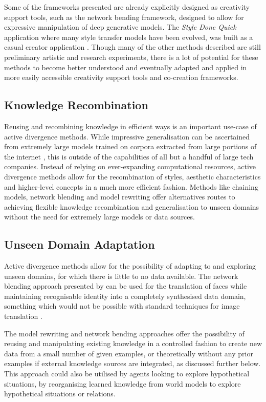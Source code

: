 Some of the frameworks presented are already explicitly designed as creativity support tools, such as the network bending framework, designed to allow for expressive manipulation of deep generative models. 
The \textit{Style Done Quick} \citep{colton2021evolving} application where many style transfer models have been evolved, was built as a casual creator application \citep{compton2015casual}. 
Though many of the other methods described are still preliminary artistic and research experiments, there is a lot of potential for these methods to become better understood and eventually adapted and applied in more easily accessible creativity support tools and co-creation frameworks. 

\subsection{Knowledge Recombination}

Reusing and recombining knowledge in efficient ways is an important use-case of active divergence methods. While impressive generalisation can be ascertained from extremely large models trained on corpora extracted from large portions of the internet \citep{ramesh2021zero}, this is outside of the capabilities of all but a handful of large tech companies. 
Instead of relying on ever-expanding computational resources, active divergence methods allow for the recombination of styles, aesthetic characteristics and higher-level concepts in a much more efficient fashion. 
Methods like chaining models, network blending and model rewriting offer alternatives routes to achieving flexible knowledge recombination and generalisation to unseen domains without the need for extremely large models or data sources. 

\subsection{Unseen Domain Adaptation}

Active divergence methods allow for the possibility of adapting to and exploring unseen domains, for which there is little to no data available. 
The network blending approach presented by \citet{pinkney2020interpolation} can be used for the translation of faces while maintaining recognisable identity into a completely synthesised data domain, something which would not be possible with standard techniques for image translation \citep{zhu2017unpaired}.

The model rewriting and network bending approaches offer the possibility of reusing and manipulating existing knowledge in a controlled fashion to create new data from a small number of given examples, or theoretically without any prior examples if external knowledge sources are integrated, as discussed further below. 
This approach could also be utilised by agents looking to explore hypothetical situations, by reorganising learned knowledge from world models \citep{ha2018worldmodels} to explore hypothetical situations or relations. 

